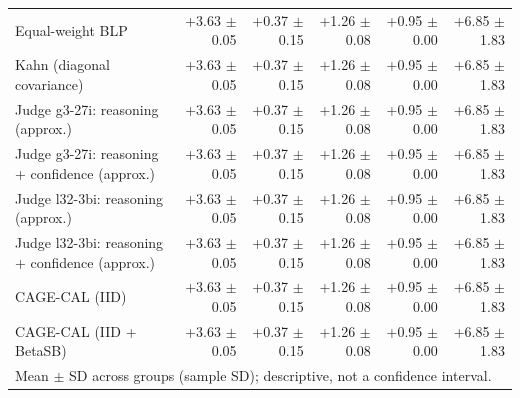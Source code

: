 \begin{tabular}{lrrrrr}
Equal-weight BLP & +3.63 {\scriptsize $\pm$ 0.05} & +0.37 {\scriptsize $\pm$ 0.15} & +1.26 {\scriptsize $\pm$ 0.08} & +0.95 {\scriptsize $\pm$ 0.00} & +6.85 {\scriptsize $\pm$ 1.83} \\
Kahn (diagonal covariance) & +3.63 {\scriptsize $\pm$ 0.05} & +0.37 {\scriptsize $\pm$ 0.15} & +1.26 {\scriptsize $\pm$ 0.08} & +0.95 {\scriptsize $\pm$ 0.00} & +6.85 {\scriptsize $\pm$ 1.83} \\
Judge g3-27i: reasoning (approx.) & +3.63 {\scriptsize $\pm$ 0.05} & +0.37 {\scriptsize $\pm$ 0.15} & +1.26 {\scriptsize $\pm$ 0.08} & +0.95 {\scriptsize $\pm$ 0.00} & +6.85 {\scriptsize $\pm$ 1.83} \\
Judge g3-27i: reasoning + confidence (approx.) & +3.63 {\scriptsize $\pm$ 0.05} & +0.37 {\scriptsize $\pm$ 0.15} & +1.26 {\scriptsize $\pm$ 0.08} & +0.95 {\scriptsize $\pm$ 0.00} & +6.85 {\scriptsize $\pm$ 1.83} \\
Judge l32-3bi: reasoning (approx.) & +3.63 {\scriptsize $\pm$ 0.05} & +0.37 {\scriptsize $\pm$ 0.15} & +1.26 {\scriptsize $\pm$ 0.08} & +0.95 {\scriptsize $\pm$ 0.00} & +6.85 {\scriptsize $\pm$ 1.83} \\
Judge l32-3bi: reasoning + confidence (approx.) & +3.63 {\scriptsize $\pm$ 0.05} & +0.37 {\scriptsize $\pm$ 0.15} & +1.26 {\scriptsize $\pm$ 0.08} & +0.95 {\scriptsize $\pm$ 0.00} & +6.85 {\scriptsize $\pm$ 1.83} \\
CAGE-CAL (IID) & +3.63 {\scriptsize $\pm$ 0.05} & +0.37 {\scriptsize $\pm$ 0.15} & +1.26 {\scriptsize $\pm$ 0.08} & +0.95 {\scriptsize $\pm$ 0.00} & +6.85 {\scriptsize $\pm$ 1.83} \\
CAGE-CAL (IID + BetaSB) & +3.63 {\scriptsize $\pm$ 0.05} & +0.37 {\scriptsize $\pm$ 0.15} & +1.26 {\scriptsize $\pm$ 0.08} & +0.95 {\scriptsize $\pm$ 0.00} & +6.85 {\scriptsize $\pm$ 1.83} \\
\bottomrule
\multicolumn{6}{l}{\scriptsize Mean $\pm$ SD across groups (sample SD); descriptive, not a confidence interval.} \\
\end{tabular}
